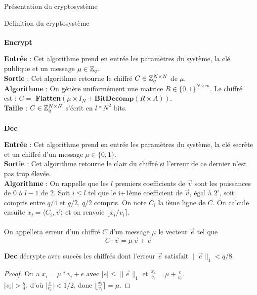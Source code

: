 \begin{section}{Présentation du cryptosystème}
\begin{subsection}{Définition du cryptosystème}
	\paragraph{}
	\textbf{Encrypt}
	\flushleft
	
	\textbf{Entrée} : Cet algorithme prend en entrée les paramètres du système, la clé publique et un message $\mu \in \mathbb{Z}_q$. \\
	\textbf{Sortie} : Cet algorithme retourne le chiffré $C \in \mathbb{Z}_q^{N \times N}$ de $\mu$.\\
	\textbf{Algorithme} : On génère uniformément une matrice $R \in \{ 0,1\} ^{N \times m}$. Le chiffré est : $C = $ \textbf{Flatten}$(\mu \times I_N + \textbf{BitDecomp}(R \times A))$. \\
	\textbf{Taille} : $C \in \mathbb{Z}_q^{N \times N}$ s'écrit en $l * N^2$ bits.
	
	\paragraph{}
	\textbf{Dec}
	\flushleft
	
	\textbf{Entrée} : Cet algorithme prend en entrée les paramètres du système, la clé secrète et un chiffré d'un message $\mu \in \{ 0,1\} $. \\
	\textbf{Sortie} : Cet algorithme retourne le clair du chiffré si l'erreur de ce dernier n'est pas trop élevée.\\
	\textbf{Algorithme} : On rappelle que les $l$ premiers coefficients de $\vec{v}$ sont les puissances de 0 à $l-1$ de 2. Soit $i \leqslant l$ tel que le i+1ème coefficient de $\vec{v}$, égal à $2^{i}$, soit compris entre $q/4$ et $q/2$, $q/2$ compris. On note $C_i$ la ième ligne de $C$. On calcule ensuite $x_i = \langle C_i, \vec{v} \rangle$ et on renvoie $\lfloor x_i/v_i \rceil$.


\paragraph{}
\begin{definition}
On appellera erreur d'un chiffré $C$ d'un message $\mu$ le vecteur $\vec{e}$ tel que  
\[ C\cdot \vec{v} = \mu\, \vec{v} + \vec{e} \]
\end{definition}
\begin{prop}
	\textbf{Dec} décrypte avec succès les chiffrés dont l'erreur $\vec{e}$ satisfait $\|\vec{e}\|_1 < q/8$.
\end{prop}
\begin{proof}
	On a $x_i = \mu * v_i + e$ avec $\lvert e \lvert \leqslant \|\vec{e}\|_1$ et $\frac{x_i}{v_i} = \mu + \frac{e}{v_i}$. \\
	$\lvert v_i \lvert > \frac{q}{4}$, d'où $\lvert \frac{e}{v_i} \lvert < 1/2$, donc $\lfloor \frac{x_i}{v_i} \rceil = \mu$.
\end{proof}
	\end{subsection}
	

\end{section}
